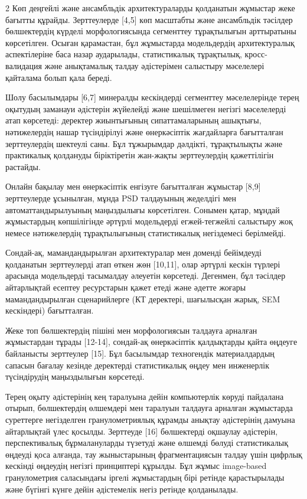 \begin{multicols}{2}
Көп деңгейлі және ансамбльдік архитектураларды қолданатын жұмыстар жеке
бағытты құрайды. Зерттеулерде {[}4,5{]} көп масштабты және ансамбльдік
тәсілдер бөлшектердің күрделі морфологиясында сегменттеу тұрақтылығын
арттыратыны көрсетілген. Осыған қарамастан, бұл жұмыстарда модельдердің
архитектуралық аспектілеріне баса назар аударылады, статистикалық
тұрақтылық, кросс-валидация және анықтамалық талдау әдістерімен
салыстыру мәселелері қайталама болып қала береді.

Шолу басылымдары {[}6,7{]} минералды кескіндерді сегменттеу
мәселелерінде терең оқытудың заманауи әдістерін жүйелейді және
шешілмеген негізгі мәселелерді атап көрсетеді: деректер жиынтығының
сипаттамаларының ашықтығы, нәтижелердің нашар түсіндірілуі және
өнеркәсіптік жағдайларға бағытталған зерттеулердің шектеулі саны. Бұл
тұжырымдар дәлдікті, тұрақтылықты және практикалық қолдануды
біріктіретін жан-жақты зерттеулердің қажеттілігін растайды.

Онлайн бақылау мен өнеркәсіптік енгізуге бағытталған жұмыстар {[}8,9{]}
зерттеулерде ұсынылған, мұнда PSD талдауының жеделдігі мен
автоматтандырылуының маңыздылығы көрсетілген. Сонымен қатар, мұндай
жұмыстардың көпшілігінде әртүрлі модельдерді егжей-тегжейлі салыстыру
жоқ немесе нәтижелердің тұрақтылығының статистикалық негіздемесі
берілмейді.

Сондай-ақ, мамандандырылған архитектуралар мен доменді бейімдеуді
қолданатын зерттеулерді атап өткен жөн {[}10,11{]}, олар әртүрлі кескін
түрлері арасында модельдерді тасымалдау әлеуетін көрсетеді. Дегенмен,
бұл тәсілдер айтарлықтай есептеу ресурстарын қажет етеді және әдетте
жоғары мамандандырылған сценарийлерге (КТ деректері, шағылысқан жарық,
SEM кескіндері) бағытталған.

Жеке топ бөлшектердің пішіні мен морфологиясын талдауға арналған
жұмыстардан тұрады {[}12-14{]}, сондай-ақ өнеркәсіптік қалдықтарды қайта
өңдеуге байланысты зерттеулер {[}15{]}. Бұл басылымдар техногендік
материалдардың сапасын бағалау кезінде деректерді статистикалық өңдеу
мен инженерлік түсіндірудің маңыздылығын көрсетеді.

Терең оқыту әдістерінің кең таралуына дейін компьютерлік көруді
пайдалана отырып, бөлшектердің өлшемдері мен таралуын талдауға арналған
жұмыстарда суреттерге негізделген гранулометриялық құрамды анықтау
әдістерінің дамуына айтарлықтай үлес қосылды. Зерттеуде {[}16{]}
бөлшектерді оқшаулау әдістерін, перспективалық бұрмалануларды түзетуді
және өлшемді бөлуді статистикалық өңдеуді қоса алғанда, тау жыныстарының
фрагментациясын талдау үшін цифрлық кескінді өңдеудің негізгі
принциптері құрылды. Бұл жұмыс image-based гранулометрия саласындағы
іргелі жұмыстардың бірі ретінде қарастырылады және бүгінгі күнге дейін
әдістемелік негіз ретінде қолданылады.


\end{multicols}
